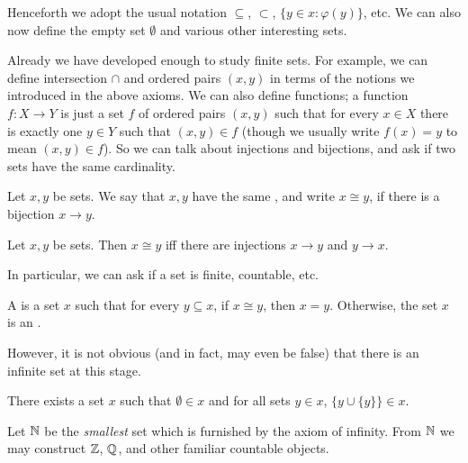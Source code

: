 \begin{subsec}
Henceforth we adopt the usual notation $\subseteq$, $\subset$, $\{y \in x: \varphi(y)\}$, etc.
We can also now define the empty set $\emptyset$ and various other interesting sets.
\end{subsec}

\begin{subsec}
Already we have developed enough to study finite sets.
For example, we can define intersection $\cap$ and ordered pairs $(x, y)$ in terms of the notions we introduced in the above axioms.
We can also define functions; a function $f: X \to Y$ is just a set $f$ of ordered pairs $(x, y)$ such that for every $x \in X$ there is exactly one $y \in Y$ such that $(x, y) \in f$ (though we usually write $f(x) = y$ to mean $(x, y) \in f$).
So we can talk about injections and bijections, and ask if two sets have the same cardinality.
\end{subsec}

\begin{definition}
Let $x, y$ be sets. We say that $x, y$ have the same , and write $x \cong y$, if there is a bijection $x \to y$.
\end{definition}

\begin{theorem}
Let $x, y$ be sets. Then $x \cong y$ iff there are injections $x \to y$ and $y \to x$.
\end{theorem}

\begin{subsec}
In particular, we can ask if a set is finite, countable, etc.
\end{subsec}

\begin{definition}
A  is a set $x$ such that for every $y \subseteq x$, if $x \cong y$, then $x = y$.
Otherwise, the set $x$ is an .
\end{definition}

\begin{subsec}
However, it is not obvious (and in fact, may even be false) that there is an infinite set at this stage.
\end{subsec}

\begin{axiom}[infinity]
There exists a set $x$ such that $\emptyset \in x$ and for all sets $y \in x$, $\{y \cup \{y\}\} \in x$.
\end{axiom}

\begin{subsec}
Let $\mathbb{N}$ be the \emph{smallest} set which is furnished by the axiom of infinity.
From $\mathbb{N}$ we may construct $\mathbb{Z}$, $\mathbb{Q}$, and other familiar countable objects.
\end{subsec}

